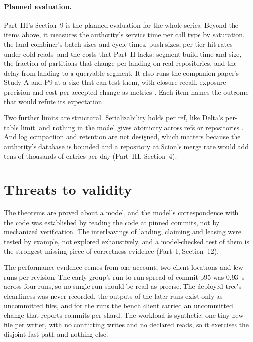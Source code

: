 \documentclass[11pt,letterpaper]{article}
\theoremstyle{definition}
\theoremstyle{remark}
\begin{document}
\paragraph{Planned evaluation.} Part~III's Section~9 is the planned evaluation for the whole series. Beyond the items above, it measures the authority's service time per call type by saturation, the land combiner's batch sizes and cycle times, push sizes, per-tier hit rates under cold reads, and the costs that Part~II lacks: segment build time and size, the fraction of partitions that change per landing on real repositories, and the delay from landing to a queryable segment. It also runs the companion paper's Study A and P9 at a size that can test them, with closure recall, exposure precision and cost per accepted change as metrics \cite{long2026inversion}. Each item names the outcome that would refute its expectation.

Two further limits are structural. Serializability holds per ref, like Delta's per-table limit, and nothing in the model gives atomicity across refs or repositories \cite{armbrust2020delta}. And log compaction and retention are not designed, which matters because the authority's database is bounded and a repository at Scion's merge rate would add tens of thousands of entries per day (Part~III, Section~4). %

\section{Threats to validity}
\label{sec:syn:threats}

The theorems are proved about a model, and the model's correspondence with the code was established by reading the code at pinned commits, not by mechanized verification. The interleavings of landing, claiming and leasing were tested by example, not explored exhaustively, and a model-checked test of them is the strongest missing piece of correctness evidence (Part~I, Section~12).

The performance evidence comes from one account, two client locations and few runs per revision. The early group's run-to-run spread of commit p95 was 0.93~s across four runs, so no single run should be read as precise. %
The deployed tree's cleanliness was never recorded, the outputs of the later runs exist only as uncommitted files, and for the  runs the bench client carried an uncommitted change that reports commits per shard. The workload is synthetic: one tiny new file per writer, with no conflicting writes and no declared reads, so it exercises the disjoint fast path and nothing else.
\end{document}
